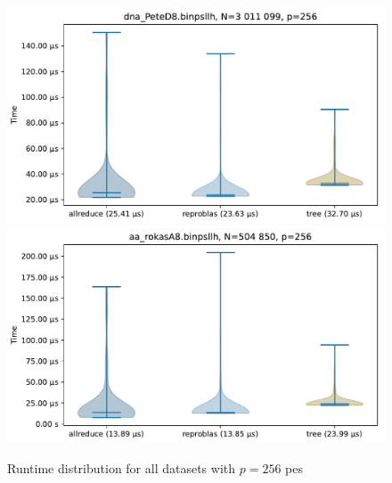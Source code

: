 \begin{figure}\centering\ContinuedFloat
\includegraphics[scale=\mScale]{figures/violinPeteD8.pdf}
\includegraphics[scale=\mScale]{figures/violinRokasA8.pdf}

\caption{Runtime distribution for all datasets with $p=256$ \glspl{pe}}

\end{figure}



